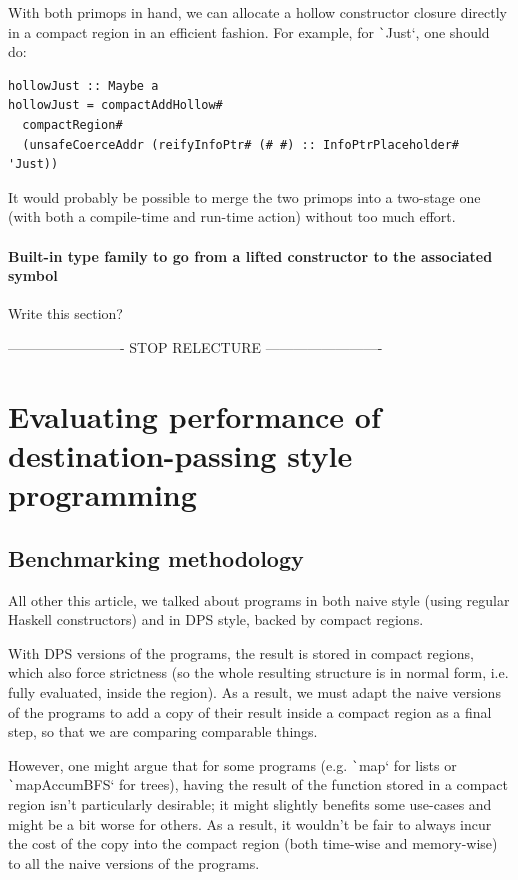 \documentclass[english]{jflart}
\newcommand{\TODO}[1]{{\color{red}\large #1}}
\begin{document}
With both primops in hand, we can allocate a hollow constructor closure directly in a compact region in an efficient fashion. For example, for \texttt`Just`, one should do:
{\small
\begin{verbatim}
hollowJust :: Maybe a
hollowJust = compactAddHollow#
  compactRegion#
  (unsafeCoerceAddr (reifyInfoPtr# (# #) :: InfoPtrPlaceholder# 'Just))  
\end{verbatim}
}

It would probably be possible to merge the two primops into a two-stage one (with both a compile-time and run-time action) without too much effort.

\paragraph{Built-in type family to go from a lifted constructor to the associated symbol}

\TODO{Write this section?}

\clearpage{}
\TODO{------------------------- STOP RELECTURE -------------------------}

\section{Evaluating performance of destination-passing style programming}

\subsection{Benchmarking methodology}

All other this article, we talked about programs in both naive style (using regular Haskell constructors) and in DPS style, backed by compact regions.

With DPS versions of the programs, the result is stored in compact regions, which also force strictness (so the whole resulting structure is in normal form, i.e. fully evaluated, inside the region). As a result, we must adapt the naive versions of the programs to add a copy of their result inside a compact region as a final step, so that we are comparing comparable things.

However, one might argue that for some programs (e.g. \texttt`map` for lists or \texttt`mapAccumBFS` for trees), having the result of the function stored in a compact region isn't particularly desirable; it might slightly benefits some use-cases and might be a bit worse for others. As a result, it wouldn't be fair to always incur the cost of the copy into the compact region (both time-wise and memory-wise) to all the naive versions of the programs.
\end{document}
